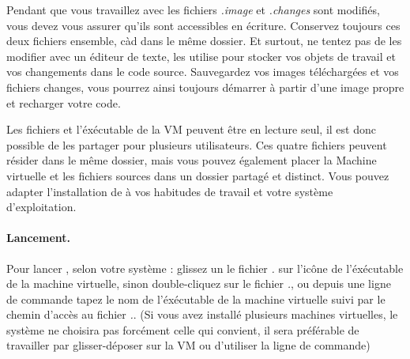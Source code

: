 \documentclass[a4paper,10pt,twoside]{book}
\begin{document}

Pendant que vous travaillez avec \sq les fichiers \emph{.image} et \emph{.changes} sont modifiés, vous devez vous assurer qu'ils sont accessibles en écriture.
Conservez toujours ces deux fichiers ensemble, càd dans le même dossier.
Et surtout, ne tentez pas de les modifier avec un éditeur de texte, \sq les utilise pour stocker vos objets de travail et vos changements dans le code source.
Sauvegardez vos images téléchargées et vos fichiers changes, vous pourrez ainsi toujours démarrer à partir d'une image propre et recharger votre code.


Les fichiers  et l'éxécutable de la VM peuvent être en lecture seul, il est donc possible de les partager pour plusieurs utilisateurs.
Ces quatre fichiers peuvent résider dans le même dossier, mais vous pouvez également placer la Machine virtuelle et les fichiers sources dans un dossier partagé et distinct.
Vous pouvez adapter l'installation de \sq à vos habitudes de travail et votre système d'exploitation.




\paragraph{Lancement.} Pour lancer \sq, selon votre système : glissez un le fichier \emph{.} sur l'icône de l'éxécutable de la machine virtuelle, sinon double-cliquez sur le fichier \emph{.}, ou depuis une ligne de commande tapez le nom de l'éxécutable de la machine virtuelle suivi par le chemin d'accès au fichier  \emph{.}. (Si vous avez installé plusieurs machines virtuelles, le système ne choisira pas forcément celle qui convient, il sera préférable de travailler par glisser-déposer sur la VM ou d'utiliser la ligne de commande)
\end{document}
